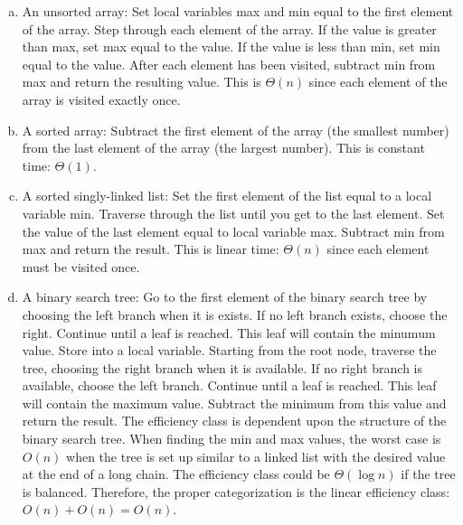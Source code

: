 \documentclass[11pt]{article}
\begin{document}
\begin{enumerate}[(a)]
\item An unsorted array: Set local variables max and min equal to the first
element of the array. Step through each element of the array. If the value
is greater than max, set max equal to the value. If the value is less than
min, set min equal to the value. After each element has been visited,
subtract min from max and return the resulting value. This is $\Theta(n)$
since each element of the array is visited exactly once. 
\item A sorted array: Subtract the first element of the array (the smallest
number) from the last element of the array (the largest number). This is
constant time: $\Theta(1)$.
\item A sorted singly-linked list: Set the first element of the list equal
to a local variable min. Traverse through the list until you get to the last
element. Set the value of the last element equal to local variable max.
Subtract min from max and return the result. This is linear time: $\Theta(n)$
since each element must be visited once.
\item A binary search tree: Go to the first element of the binary search
tree by choosing the left branch when it is exists. If no left branch
exists, choose the right. Continue until a leaf is reached. This leaf will
contain the minumum value. Store into a local variable.
Starting from the root node, traverse the tree, choosing the right branch
when it is available. If no right branch is available, choose the left 
branch. Continue until a leaf is reached. This leaf will contain 
the maximum value. Subtract the minimum from this value and return the
result. The efficiency class is dependent upon the structure of the
binary search tree. When finding the min and max values, the worst case is 
$O(n)$ when the tree is set up similar to a linked list with the desired
value at the end of a long chain. The efficiency class could be
$\Theta(\log n)$ if the tree is balanced. Therefore, the proper categorization 
is the linear efficiency class: $O(n) + O(n) = O(n)$. 
\end{enumerate}
\end{document}

